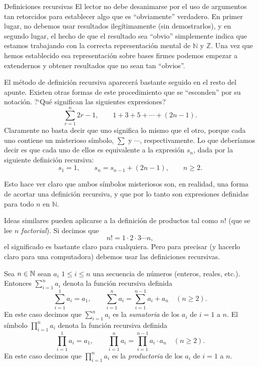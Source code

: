 \begin{section}{Definiciones recursivas}
El lector no debe desanimarse por el uso de argumentos tan retorcidos para establecer algo que es ``obviamente'' verdadero. En primer lugar, no debemos usar resultados ilegítimamente (sin demostrarlos), y en segundo lugar, el hecho de que el resultado sea ``obvio'' simplemente indica que estamos trabajando con la correcta representación mental de $\mathbb N$ y $\mathbb Z$. Una vez que hemos establecido esa representación sobre bases firmes podemos empezar a extendernos y obtener resultados que no sean tan ``obvios''.

El método de definición recursiva aparecerá bastante seguido en el resto del apunte. Existen otras formas de este procedimiento que se ``esconden'' por su notación. ?`Qué significan las siguientes expresiones?
$$
\sum_{r=1}^{n} 2r-1,\qquad 1+3+5+\cdots +(2n-1).
$$
Claramente no basta decir que uno significa lo mismo que el otro, porque cada uno contiene un misterioso símbolo, $\sum$ y $\cdots$, respectivamente. Lo que deberíamos decir es que cada uno de ellos es equivalente a la expresión $s_n$, dada por la siguiente definición recursiva:
$$
s_1= 1, \qquad s_n = s_{n-1} +(2n-1), \qquad n\ge 2.
$$

Esto hace ver claro que ambos símbolos misteriosos son, en realidad, una forma de acortar una definición recursiva, y que por lo tanto son expresiones definidas para todo $n$ en $\mathbb N$.

Ideas similares pueden aplicarse a la definición de productos tal como $n!$ (que se lee $n$ \textit{factorial}). Si decimos que
$$
n!=1 \cdot 2 \cdot 3 \cdots n,
$$
el significado es bastante claro para cualquiera. Pero para precisar (y hacerlo claro para una computadora) debemos usar las definiciones recursivas.

\begin{definicion} Sea $n \in {\mathbb N}$ sean $a_i$  $1 \le i \le n$ una secuencia de números (enteros, reales, etc.). Entonces $\sum_{i=1}^{n} a_i$  denota la función recursiva definida  
    $$
    \sum_{i=1}^{1} a_i= a_1, \qquad \sum_{i=1}^{n} a_i = \sum_{i=1}^{n-1} a_i+ a_{n} \quad (n\ge 2).
    $$
    En  este caso  decimos que  $\sum_{i=1}^{n} a_i$ es la \textit{sumatoria} de los $a_i$ de $i=1$  a $n$. El símbolo $\prod_{i=1}^{n} a_i$ denota la función recursiva definida  
    $$
    \prod_{i=1}^{1} a_i= a_1, \qquad \prod_{i=1}^{n} a_i = \prod_{i=1}^{n-1} a_i \cdot  a_{n} \quad (n\ge 2).
    $$
    En  este caso  decimos que  $\prod_{i=1}^{n} a_i$ es la \textit{productoria} de los $a_i$ de $i=1$  a $n$. 
\end{definicion}




\end{section}
